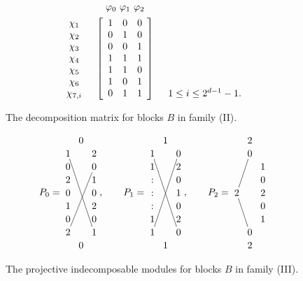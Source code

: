 \documentclass{amsart}
\theoremstyle{plain}
\theoremstyle{definition}
\theoremstyle{remark}
\begin{document}
\begin{figure}[ht]  
\caption{\label{fig:decompsl2}The decomposition matrix for blocks  $B$ in family (II).}
$$\begin{array}{ccc}
&\begin{array}{c@{}c@{}c}\varphi_0\,&\,\varphi_1\,&\,\varphi_2\end{array}\\[1ex]
\begin{array}{c}\chi_1\\ \chi_2\\ \chi_3 \\ \chi_4\\ \chi_5\\ \chi_6\\ \chi_{7,i}\end{array} &
\left[\begin{array}{ccc}1&0&0\\0&1&0\\0&0&1\\1&1&1\\1&1&0\\1&0&1\\0&1&1\end{array}\right]
&\begin{array}{c}\\ \\ \\ \\ \\ \\1\le i\le 2^{d-1}-1.\end{array}
\end{array}$$
\end{figure}
\begin{figure}[ht] 
\caption{\label{fig:a7B} The projective indecomposable modules
for blocks $B$ in family (III).}
$$P_0=\vcenter{\xymatrix @R=.1pc @C=.2pc {&0&\\
1\ar@{-}[rrdddddd]&&2\\0&&0\ar@{-}[llddddd]\\2&&1\\ 0&&0\\1&&2\\0&&0\\
2&&1\\&0&}},
\qquad P_1=\vcenter{\xymatrix @R=.1pc @C=.2pc {&1&\\1\ar@{-}[rrdddddd]&&0\ar@{-}[lldddddd]\\ 
1&&2\\:&&0\\ :&&1\\ :&&0\\ 1&&2\\1&&0\\&1&}},
\qquad P_2=\vcenter{\xymatrix @R=.1pc @C=.2pc {&2&\\&0\ar@{-}[lddd]&\\
&&1\\&&0\\2\ar@{-}[rddd]&&2\\&&0\\&&1\\&0&\\&2&}}$$
\vspace{1ex}
\end{figure}
\end{document}
